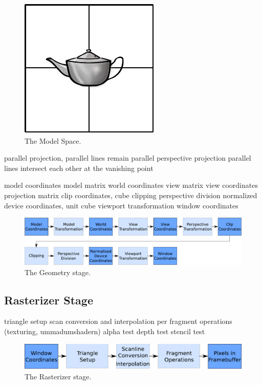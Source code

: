 \begin{figure}
\begin{center}
\includegraphics[scale=0.8]{Images/ModelSpace.pdf}
\caption{The Model Space.}
\label{fig:ModelSpace}
\end{center}
\end{figure}

parallel projection, parallel lines remain parallel
perspective projection parallel lines intersect each other at the vanishing
point

model coordinates
model matrix
world coordinates
view matrix
view coordinates
projection matrix
clip coordinates, cube
clipping
perspective division
normalized device coordinates, unit cube
viewport transformation
window coordinates
\begin{figure}
\begin{center}
\includegraphics[scale=0.5]{Images/Geometry-Stage.pdf}
\caption{The Geometry stage.}
\label{fig:GeometryStage}
\end{center}
\end{figure}


\subsection{Rasterizer Stage}

triangle setup
scan conversion and interpolation
per fragment operations (texturing, ummadumshadern)
alpha test
depth test
stencil test
\begin{figure}
\begin{center}
\includegraphics[scale=0.5]{Images/Rasterizer-Stage.pdf}
\caption{The Rasterizer stage.}
\label{fig:RasterizerStage}
\end{center}
\end{figure}


